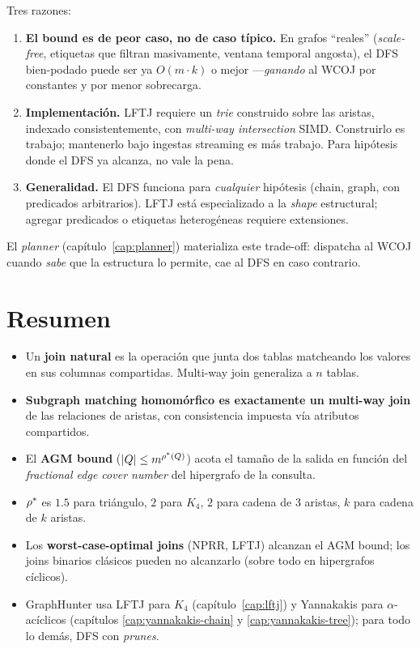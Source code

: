 Tres razones:

\begin{enumerate}
    \item \textbf{El bound es de peor caso, no de caso típico.} En
    grafos ``reales'' (\emph{scale-free}, etiquetas que filtran
    masivamente, ventana temporal angosta), el DFS bien-podado puede
    ser ya \(O(m \cdot k)\) o mejor ---\emph{ganando} al WCOJ por
    constantes y por menor sobrecarga.
    \item \textbf{Implementación.} LFTJ requiere un \emph{trie}
    construido sobre las aristas, indexado consistentemente, con
    \emph{multi-way intersection} SIMD. Construirlo es trabajo;
    mantenerlo bajo ingestas streaming es más trabajo. Para
    hipótesis donde el DFS ya alcanza, no vale la pena.
    \item \textbf{Generalidad.} El DFS funciona para
    \emph{cualquier} hipótesis (chain, graph, con predicados
    arbitrarios). LFTJ está especializado a la \emph{shape}
    estructural; agregar predicados o etiquetas heterogéneas requiere
    extensiones.
\end{enumerate}

El \emph{planner} (capítulo~\ref{cap:planner}) materializa este
trade-off: dispatcha al WCOJ cuando \emph{sabe} que la estructura lo
permite, cae al DFS en caso contrario.

\section{Resumen}

\begin{itemize}
    \item Un \textbf{join natural} es la operación que junta dos
    tablas matcheando los valores en sus columnas compartidas.
    Multi-way join generaliza a \(n\) tablas.
    \item \textbf{Subgraph matching homomórfico es exactamente un
    multi-way join} de las relaciones de aristas, con consistencia
    impuesta vía atributos compartidos.
    \item El \textbf{AGM bound}
    (\(|Q| \leq m^{\rho^{*}(Q)}\)) acota el tamaño de la salida en
    función del \emph{fractional edge cover number} del hipergrafo
    de la consulta.
    \item \(\rho^{*}\) es \(1.5\) para triángulo, \(2\) para
    \(K_4\), \(2\) para cadena de 3 aristas, \(k\) para cadena de
    \(k\) aristas.
    \item Los \textbf{worst-case-optimal joins} (NPRR, LFTJ) alcanzan
    el AGM bound; los joins binarios clásicos pueden no alcanzarlo
    (sobre todo en hipergrafos cíclicos).
    \item GraphHunter usa LFTJ para \(K_4\) (capítulo~\ref{cap:lftj})
    y Yannakakis para \(\alpha\)-acíclicos (capítulos
    \ref{cap:yannakakis-chain} y \ref{cap:yannakakis-tree});
    para todo lo demás, DFS con \emph{prunes}.
\end{itemize}

